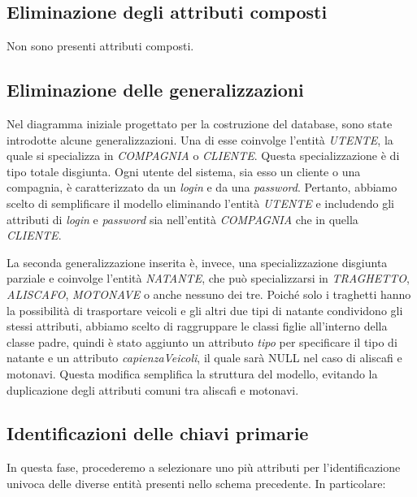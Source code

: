 \subsection{Eliminazione degli attributi composti}
Non sono presenti attributi composti.

\subsection{Eliminazione delle generalizzazioni}
Nel diagramma iniziale progettato per la costruzione del database, sono state introdotte alcune generalizzazioni. Una di esse coinvolge l'entità \textit{UTENTE}, la quale si specializza in \textit{COMPAGNIA} o \textit{CLIENTE}. Questa specializzazione è di tipo totale disgiunta. Ogni utente del sistema, sia esso un cliente o una compagnia, è caratterizzato da un \textit{login} e da una \textit{password}. Pertanto, abbiamo scelto di semplificare il modello eliminando l'entità \textit{UTENTE} e includendo gli attributi di \textit{login} e \textit{password} sia nell'entità \textit{COMPAGNIA} che in quella \textit{CLIENTE}.

La seconda generalizzazione inserita è, invece, una specializzazione disgiunta parziale e coinvolge l'entità \textit{NATANTE}, che può specializzarsi in \textit{TRAGHETTO}, \textit{ALISCAFO}, \textit{MOTONAVE} o anche nessuno dei tre. Poiché solo i traghetti hanno la possibilità di trasportare veicoli e gli altri due tipi di natante condividono gli stessi attributi, abbiamo scelto di raggruppare le classi figlie all'interno della classe padre, quindi è stato aggiunto un attributo \textit{tipo} per specificare il tipo di natante e un attributo \textit{capienzaVeicoli}, il quale sarà NULL nel caso di aliscafi e motonavi. Questa modifica semplifica la struttura del modello, evitando la duplicazione degli attributi comuni tra aliscafi e motonavi.

\subsection{Identificazioni delle chiavi primarie}
In questa fase, procederemo a selezionare uno più attributi per l'identificazione univoca delle diverse entità presenti nello schema precedente. In particolare:

